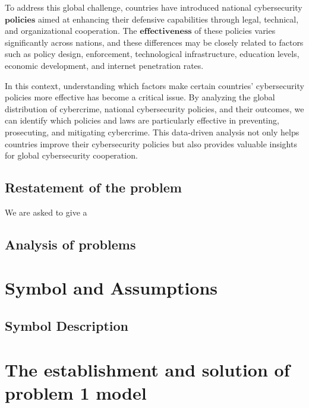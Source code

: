 \documentclass[12pt]{article}
\begin{document}
		To address this global challenge,
		countries have introduced national cybersecurity \( \textbf{policies} \) aimed at enhancing their defensive capabilities through legal, technical, and organizational cooperation.
		The \( \textbf{effectiveness} \) of these policies varies significantly across nations, and
		these differences may be closely related to factors such as policy design, enforcement, technological infrastructure, education levels, economic development, and internet penetration rates.

		In this context, understanding which factors make certain countries' cybersecurity policies more effective has become a critical issue.
		By analyzing the global distribution of cybercrime, national cybersecurity policies, and their outcomes,
		we can identify which policies and laws are particularly effective in preventing, prosecuting, and mitigating cybercrime.
		This data-driven analysis not only helps countries improve their cybersecurity policies but also provides valuable insights for global cybersecurity cooperation.
	\subsection{Restatement of the problem}\label{subsec:restatement-of-the-problem} %
		We are asked to give a
	\subsection{Analysis of problems}\label{subsec:analysis-of-problems} %
	
\section{Symbol and Assumptions}\label{sec:symbol-and-assumptions} %
	\subsection{Symbol Description}\label{subsec:symbol-description} %
	
\section{The establishment and solution of problem 1 model}\label{sec:the-establishment-and-solution-of-problem-1-model} %
\end{document}
